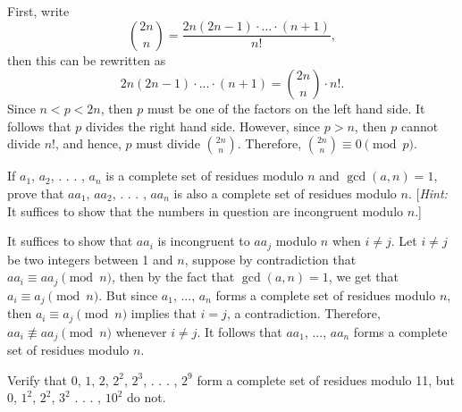 \begin{solution}
    First, write
    $$\binom{2n}{n} = \frac{2n(2n-1) \cdot ... \cdot (n+1)}{n!},$$
    then this can be rewritten as
    $$2n(2n-1) \cdot ... \cdot (n+1) = \binom{2n}{n} \cdot n!.$$
    Since $n < p < 2n$, then $p$ must be one of the factors on the left hand side. It follows that $p$ divides the right hand side. However, since $p > n$, then $p$ cannot divide $n!$, and hence, $p$ must divide $\binom{2n}{n}$. Therefore, $\binom{2n}{n} \equiv 0 \pmod p$. \\
\end{solution}

\begin{exercise}
    If $a_1$, $a_2$, . . . , $a_n$ is a complete set of residues modulo $n$ and $\gcd(a,n) = 1$, prove that $aa_1$, $aa_2$, . . . , $aa_n$ is also a complete set of residues modulo $n$. [\textit{Hint:} It suffices to show that the numbers in question are incongruent modulo $n$.]\\
\end{exercise}

\begin{solution}
    It suffices to show that $aa_i$ is incongruent to $aa_j$ modulo $n$ when $i \neq j$. Let $i \neq j$ be two integers between 1 and $n$, suppose by contradiction that $aa_i \equiv aa_j \pmod n$, then by the fact that $\gcd(a,n) = 1$, we get that $a_i \equiv a_j \pmod n$. But since $a_1$, ..., $a_n$ forms a complete set of residues modulo $n$, then $a_i \equiv a_j \pmod n$ implies that $i = j$, a contradiction. Therefore, $aa_i \not\equiv aa_j \pmod n$ whenever $i \neq j$. It follows that $aa_1$, ..., $aa_n$ forms a complete set of residues modulo $n$. \\
\end{solution}

\begin{exercise}
    Verify that $0$, $1$, $2$, $2^2$, $2^3$, . . . , $2^9$ form a complete set of residues modulo 11, but $0$, $1^2$, $2^2$, $3^2$ . . . , $10^2$ do not. \\
\end{exercise}

